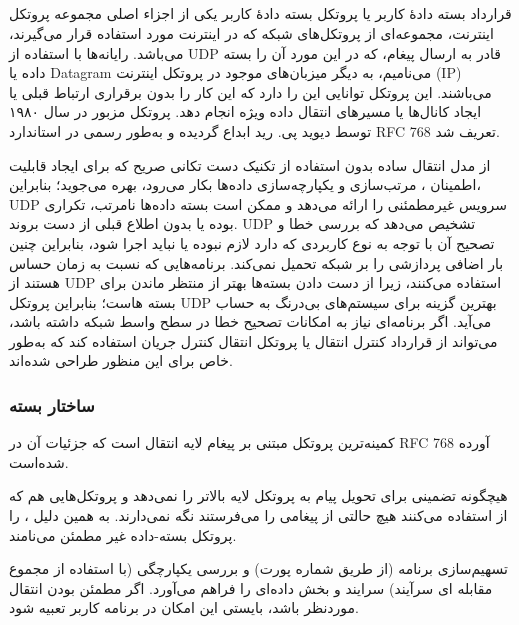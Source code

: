 \documentclass[12pt]{book}
\begin{document}
\subsection{}


قرارداد بسته دادهٔ کاربر یا پروتکل بسته دادهٔ کاربر
یکی از اجزاء اصلی مجموعه پروتکل اینترنت، مجموعه‌ای از پروتکل‌های شبکه که در اینترنت مورد استفاده قرار می‌گیرند، می‌باشد. رایانه‌ها با استفاده از UDP قادر به ارسال پیغام، که در این مورد آن را بسته داده یا Datagram می‌نامیم، به دیگر میزبان‌های موجود در پروتکل اینترنت (IP) می‌باشند. این پروتکل توانایی این را دارد که این کار را بدون برقراری ارتباط قبلی یا ایجاد کانال‌ها یا مسیرهای انتقال داده ویژه انجام دهد. پروتکل مزبور در سال ۱۹۸۰ توسط دیوید پی. رید ابداع گردیده و به‌طور رسمی در استاندارد RFC 768 تعریف شد. 

 از مدل انتقال ساده بدون استفاده از تکنیک دست تکانی صریح که برای ایجاد قابلیت اطمینان
   ، مرتب‌سازی و یکپارچه‌سازی داده‌ها بکار می‌رود، بهره می‌جوید؛ بنابراین، UDP سرویس غیرمطمئنی را ارائه می‌دهد و ممکن است بسته داده‌ها نامرتب، تکراری بوده یا بدون اطلاع قبلی از دست بروند. UDP تشخیص می‌دهد که بررسی خطا و تصحیح آن با توجه به نوع کاربردی که دارد لازم نبوده یا نباید اجرا شود، بنابراین چنین بار اضافی پردازشی را بر شبکه تحمیل نمی‌کند. برنامه‌هایی که نسبت به زمان حساس هستند از UDP استفاده می‌کنند، زیرا از دست دادن بسته‌ها بهتر از منتظر ماندن برای بسته هاست؛ بنابراین پروتکل UDP بهترین گزینه برای سیستم‌های بی‌درنگ به حساب می‌آید. اگر برنامه‌ای نیاز به امکانات تصحیح خطا در سطح واسط شبکه داشته باشد، می‌تواند از قرارداد کنترل انتقال
   یا پروتکل انتقال کنترل جریان 
    استفاده کند که به‌طور خاص برای این منظور طراحی شده‌اند. 


\subsubsection{ساختار بسته }

 کمینه‌ترین پروتکل مبتنی بر پیغام لایه انتقال است که جزئیات آن در RFC 768 آورده شده‌است. 
 
  هیچگونه تضمینی برای تحویل پیام به پروتکل لایه بالاتر را نمی‌دهد و پروتکل‌هایی هم که از 
   استفاده می‌کنند هیچ حالتی از پیغامی را می‌فرستند نگه نمی‌دارند. به همین دلیل ، 
را پروتکل بسته-داده غیر مطمئن می‌نامند. 

 تسهیم‌سازی برنامه (از طریق شماره پورت) و بررسی یکپارچگی (با استفاده از مجموع مقابله ای سرآیند) سرایند و بخش داده‌ای را فراهم می‌آورد. اگر مطمئن بودن انتقال موردنظر باشد، بایستی این امکان در برنامه کاربر تعبیه شود. 
 
\end{document}
